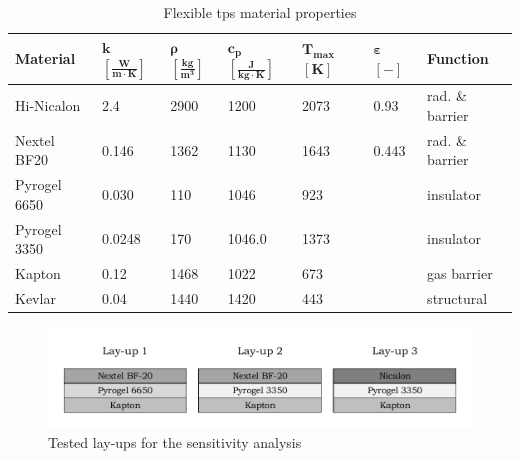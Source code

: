 \begin{table}[ht]
	\caption {Flexible \acrlong{tps} material properties}
	\centering
	\begin{tabular}{|l|l|l|l|l|l|l|}
		\hline
		\textbf{Material}         & \textbf{ $\mathbf{k}$ $\mathbf{\left[\frac{W}{m\cdot K}\right]} $} & \textbf{ $\mathbf{ \rho }$ $\mathbf{ \left[ \frac{kg}{m^3} \right] }$} & \textbf{  $\mathbf{ c_{p} }$ $\mathbf{ \left[ \frac{J}{kg \cdot K} \right] }$ }& \textbf{ $\mathbf{ T_{max} }$ $\mathbf{ [ K ] }$} &\textbf{ $\mathbf{ \varepsilon }$ $\mathbf{ [ - ] }$} & \textbf{Function} \\[1.6ex]   \hline \hline
		Hi-Nicalon      & 2.4       & 2900   & 1200   & 2073      & 0.93        & rad. \& barrier
\\ \hline
		Nextel BF20       & 0.146 
		& 1362                                        & 1130 
		& 1643	 & 0.443  & rad. \& barrier                                  
 \\ \hline
		Pyrogel 6650      & 0.030                                                 & 110                                        & 1046                                            & 923    & ~        & insulator                                  \\ \hline
		Pyrogel 3350      & 0.0248                                                & 170                                        & 1046.0                                         & 1373  	 & ~          & insulator                                 \\ \hline
		Kapton            & 0.12                                                  & 1468                                       & 1022                                            & 673	 & ~            & gas barrier                              \\ \hline
		Kevlar            & 0.04 & 1440                                       & 1420                                            & 443 	 & ~             & structural                            \\ \hline

	\end{tabular}
	\label{tab:tpsmatprop}
\end{table}

\begin{figure}[h]
	\centering
	\includegraphics{./Figure/Thermal/layersensthermal.pdf}
	\caption{Tested lay-ups for the sensitivity analysis}
	\label{fig:layersensthermal}
\end{figure}

